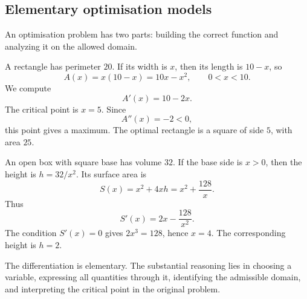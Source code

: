 \subsection{Elementary optimisation models}

An optimisation problem has two parts: building the correct function and analyzing it on the allowed domain.

\begin{examplebox}
A rectangle has perimeter \(20\). If its width is \(x\), then its length is \(10-x\), so
\[
A(x)=x(10-x)=10x-x^2,
\qquad 0<x<10.
\]
We compute
\[
A'(x)=10-2x.
\]
The critical point is \(x=5\). Since
\[
A''(x)=-2<0,
\]
this point gives a maximum. The optimal rectangle is a square of side \(5\), with area \(25\).
\end{examplebox}

\begin{examplebox}
An open box with square base has volume \(32\). If the base side is \(x>0\), then the height is \(h=32/x^2\). Its surface area is
\[
S(x)=x^2+4xh=x^2+\frac{128}{x}.
\]
Thus
\[
S'(x)=2x-\frac{128}{x^2}.
\]
The condition \(S'(x)=0\) gives \(2x^3=128\), hence \(x=4\). The corresponding height is \(h=2\).
\end{examplebox}

\begin{interpretationbox}
The differentiation is elementary. The substantial reasoning lies in choosing a variable, expressing all quantities through it, identifying the admissible domain, and interpreting the critical point in the original problem.
\end{interpretationbox}
